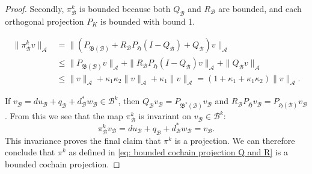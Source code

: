 \documentclass[10pt,a4paper]{amsart}
\newcommand{\Ac}{\mathcal{A}}
\newcommand{\Bc}{\mathcal{B}}
\newcommand{\Bf}{\mathfrak{B}}
\newcommand{\Hf}{\mathfrak{H}}
\begin{document}
\begin{proof}
Secondly, $\pi^k_\Bc$ is bounded because both $Q_\Bc$ and $R_\Bc$ are bounded, and each orthogonal projection $P_K$ is bounded with bound 1.

\begin{subequations}
\begin{align}
\| \pi_\Bc^k v\|_\Ac &= \|(P_{\mathfrak{B}(\Bc)} + R_\Bc P_{\mathfrak{H}}(I - Q_\Bc) + Q_\Bc)v \|_\Ac \\
&\leq  \| P_{\mathfrak{B}(\Bc)}v \|_\Ac + \| R_\Bc P_{\mathfrak{H}}(I - Q_\Bc)v \|_\Ac + \| Q_\Bc v \|_\Ac \\ 
&\leq \|v\|_\Ac + \kappa_1 \kappa_2 \|v\|_\Ac + \kappa_1 \|v\|_\Ac = (1 + \kappa_1 + \kappa_1 \kappa_2) \|v\|_\Ac.
\end{align}
\end{subequations}

If $v_\Bc = du_\Bc + q_\Bc + d^*_\Bc w_\Bc \in \Bc^k$, then $Q_\Bc v_\Bc = P_{\Bf^*(\Bc)} v_\Bc$ and $R_\Bc P_{\Hf} v_\Bc = P_{\Hf(\Bc)} v_\Bc$. From this we see that the map $\pi_\Bc^k$ is invariant on $v_\Bc \in \Bc^k$: 
\begin{equation}
\pi_\Bc^k v_\Bc = du_\Bc + q_\Bc + d^*_\Bc w_\Bc = v_\Bc.
\end{equation}
This invariance proves the final claim that $\pi^k$ is a projection. We can therefore conclude that $\pi^k$ as defined in \cref{eq: bounded cochain projection Q and R} is a bounded cochain projection.
\end{proof}
\end{document}
